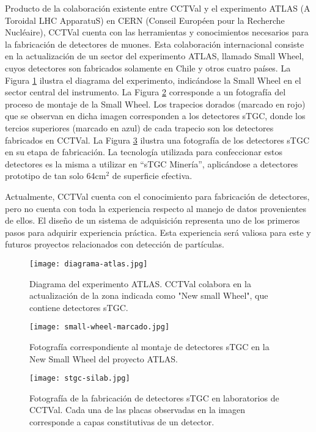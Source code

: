 	Producto de la colaboración existente entre CCTVal y el experimento ATLAS (A Toroidal LHC ApparatuS) en CERN (Conseil Européen pour la Recherche Nucléaire), CCTVal cuenta con las herramientas y conocimientos necesarios para la fabricación de detectores de muones. Esta colaboración internacional consiste en la actualización de un sector del experimento ATLAS, llamado Small Wheel, cuyos detectores son fabricados solamente en Chile y otros cuatro países. La Figura \ref{img:diagrama-atlas} ilustra el diagrama del experimento, indicándose la Small Wheel en el sector central del instrumento. La Figura \ref{img:small-wheel} corresponde a un fotografía  del proceso de montaje de la Small Wheel. Los trapecios dorados (marcado en rojo) que se observan en dicha imagen corresponden a los detectores sTGC, donde los tercios superiores (marcado en azul) de cada trapecio son los detectores fabricados en CCTVal. La Figura \ref{img:stgc-silab} ilustra una fotografía de los detectores sTGC en su etapa de fabricación. La tecnología utilizada para confeccionar estos detectores es la misma a utilizar en ``sTGC Minería'', aplicándose a detectores prototipo de tan solo 64cm$^2$ de superficie efectiva.
	
	Actualmente, CCTVal cuenta con el conocimiento para fabricación de detectores, pero no cuenta con toda la experiencia respecto al manejo de datos provenientes de ellos. El diseño de un sistema de adquisición representa uno de los primeros pasos para adquirir experiencia práctica. Esta experiencia será valiosa para este y futuros proyectos relacionados con detección de partículas.
	
	
	\begin{figure}[h]
		\centering
		\texttt{[image: diagrama-atlas.jpg]}
		\caption{Diagrama del experimento ATLAS. CCTVal colabora en la actualización de la zona indicada como "New small Wheel", que contiene detectores sTGC.}
		\label{img:diagrama-atlas}
	\end{figure}

	\begin{figure}[h]
		\centering
		\texttt{[image: small-wheel-marcado.jpg]}
		\caption{Fotografía correspondiente al montaje de detectores sTGC en la New Small Wheel del proyecto ATLAS.}
		\label{img:small-wheel}
	\end{figure}
	
	\begin{figure}[h]
		\centering
		\texttt{[image: stgc-silab.jpg]}
		\caption{Fotografía de la fabricación de detectores sTGC en laboratorios de CCTVal. Cada una de las placas observadas en la imagen corresponde a capas constitutivas de un detector.}
		\label{img:stgc-silab}
	\end{figure}

